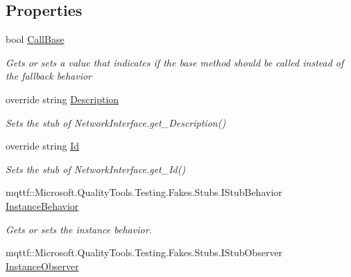 \subsection*{Properties}
\begin{DoxyCompactItemize}
\item 
bool \hyperlink{class_system_1_1_net_1_1_network_information_1_1_fakes_1_1_stub_network_interface_a72ee01085fb7801622f450aec7d96555}{Call\-Base}
\begin{DoxyCompactList}\small\item\em Gets or sets a value that indicates if the base method should be called instead of the fallback behavior\end{DoxyCompactList}\item 
override string \hyperlink{class_system_1_1_net_1_1_network_information_1_1_fakes_1_1_stub_network_interface_a34d03e6600ff7e2eab3fdac75e97990c}{Description}
\begin{DoxyCompactList}\small\item\em Sets the stub of Network\-Interface.\-get\-\_\-\-Description()\end{DoxyCompactList}\item 
override string \hyperlink{class_system_1_1_net_1_1_network_information_1_1_fakes_1_1_stub_network_interface_ac31d01d03e378f5868525eaa9ca1c6b6}{Id}
\begin{DoxyCompactList}\small\item\em Sets the stub of Network\-Interface.\-get\-\_\-\-Id()\end{DoxyCompactList}\item 
mqttf\-::\-Microsoft.\-Quality\-Tools.\-Testing.\-Fakes.\-Stubs.\-I\-Stub\-Behavior \hyperlink{class_system_1_1_net_1_1_network_information_1_1_fakes_1_1_stub_network_interface_a16edb0b4c2926396d8c9e2488f8b04f8}{Instance\-Behavior}
\begin{DoxyCompactList}\small\item\em Gets or sets the instance behavior.\end{DoxyCompactList}\item 
mqttf\-::\-Microsoft.\-Quality\-Tools.\-Testing.\-Fakes.\-Stubs.\-I\-Stub\-Observer \hyperlink{class_system_1_1_net_1_1_network_information_1_1_fakes_1_1_stub_network_interface_aa32f94295cf0d37b5cfd9504594da708}{Instance\-Observer}

\end{DoxyCompactItemize}
